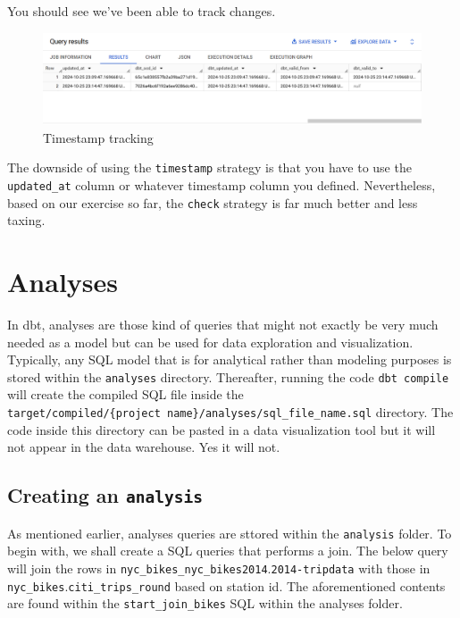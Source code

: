 \documentclass[
]{book}
\begin{document}
You should see we've been able to track changes.

\begin{figure}
\centering
\includegraphics{./images/timestamp_tracking.png}
\caption{Timestamp tracking}
\end{figure}

The downside of using the \texttt{timestamp} strategy is that you have to use the \texttt{updated\_at} column or whatever timestamp column you defined. Nevertheless, based on our exercise so far, the \texttt{check} strategy is far much better and less taxing.

\hypertarget{analyses}{%
\chapter{Analyses}\label{analyses}}

In dbt, analyses are those kind of queries that might not exactly be very much needed as a model but can be used for data exploration and visualization. Typically, any SQL model that is for analytical rather than modeling purposes is stored within the \texttt{analyses} directory. Thereafter, running the code \texttt{dbt\ compile} will create the compiled SQL file inside the \texttt{target/compiled/\{project\ name\}/analyses/sql\_file\_name.sql} directory. The code inside this directory can be pasted in a data visualization tool but it will not appear in the data warehouse. Yes it will not.

\hypertarget{creating-an-analysis}{%
\section{\texorpdfstring{Creating an \texttt{analysis}}{Creating an analysis}}\label{creating-an-analysis}}

As mentioned earlier, analyses queries are sttored within the \texttt{analysis} folder. To begin with, we shall create a SQL queries that performs a join. The below query will join the rows in \texttt{nyc\_bikes\_nyc\_bikes2014}.\texttt{2014-tripdata} with those in \texttt{nyc\_bikes}.\texttt{citi\_trips\_round} based on station id. The aforementioned contents are found within the \texttt{start\_join\_bikes} SQL within the analyses folder.
\end{document}
